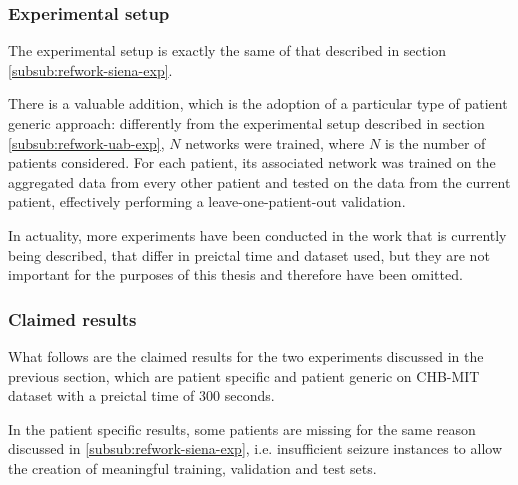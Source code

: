 \subsubsection{Experimental setup}
The experimental setup is exactly the same of that described in section \ref{subsub:refwork-siena-exp}.

There is a valuable addition, which is the adoption of a particular type of patient generic approach: differently from the experimental setup described in section \ref{subsub:refwork-uab-exp}, $N$ networks were trained, where $N$ is the number of patients considered. For each patient, its associated network was trained on the aggregated data from every other patient and tested on the data from the current patient, effectively performing a leave-one-patient-out validation.

In actuality, more experiments have been conducted in the work that is currently being described, that differ in preictal time and dataset used, but they are not important for the purposes of this thesis and therefore have been omitted.

\subsubsection{Claimed results}
What follows are the claimed results for the two experiments discussed in the previous section, which are patient specific and patient generic on \gls{CHB-MIT} dataset with a preictal time of 300 seconds.

In the patient specific results, some patients are missing for the same reason discussed in \ref{subsub:refwork-siena-exp}, i.e. insufficient seizure instances to allow the creation of meaningful training, validation and test sets.


